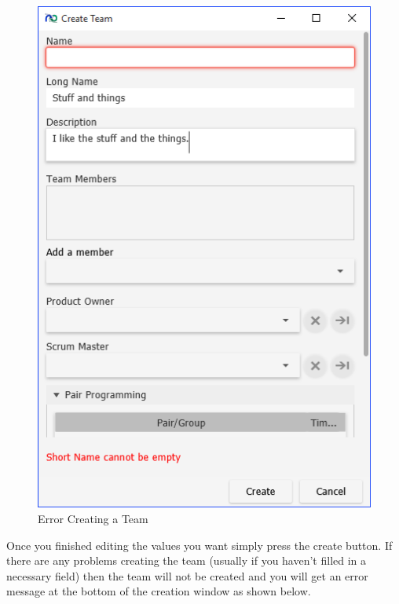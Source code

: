 \begin{figure}[h]
	\centering
	\includegraphics[width=\textwidth]{images/screenshots/teams3.PNG}
	\caption{Error Creating a Team}
	\label{fig:new_project}
\end{figure}

Once you finished editing the values you want simply press the create button. If there are any problems creating the team (usually if you haven't filled in a necessary field) then the team will not be created and you will get an error message at the bottom of the creation window as shown below.

